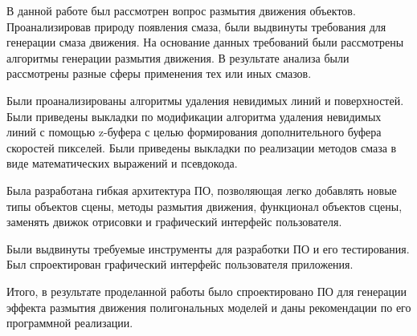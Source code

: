 \Conclusion 

В данной работе был рассмотрен вопрос размытия движения объектов. Проанализировав природу появления смаза, были выдвинуты требования для генерации смаза движения. На основание данных требований были рассмотрены алгоритмы генерации размытия движения. В результате анализа были рассмотрены разные сферы применения тех или иных смазов.

Были проанализированы алгоритмы удаления невидимых линий и поверхностей. Были приведены выкладки по модификации алгоритма удаления невидимых линий с помощью z-буфера с целью формирования дополнительного буфера скоростей пикселей. Были приведены выкладки по реализации методов смаза в виде математических выражений и псевдокода.

Была разработана гибкая архитектура ПО, позволяющая легко добавлять новые типы объектов сцены, методы размытия движения, функционал объектов сцены, заменять движок отрисовки и графический интерфейс пользователя. 

Были выдвинуты требуемые инструменты для разработки ПО и его тестирования. Был спроектирован графический интерфейс пользователя приложения.  

Итого, в результате проделанной работы было спроектировано ПО для генерации эффекта размытия движения полигональных моделей и даны рекомендации по его программной реализации.

